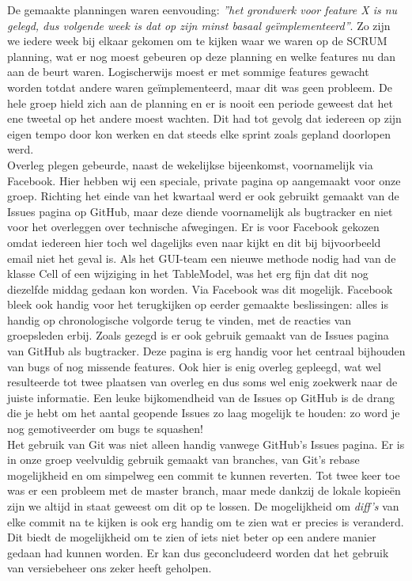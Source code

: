 \documentclass[a4paper,11pt,titlepage]{scrartcl}
\begin{document}
De gemaakte planningen waren eenvouding: \textit{''het grondwerk voor feature X is nu gelegd, dus volgende week is dat op zijn minst basaal ge\"{i}mplementeerd''}. Zo zijn we iedere week bij elkaar gekomen om te kijken waar we waren op de SCRUM planning, wat er nog moest gebeuren op deze planning en welke features nu dan aan de beurt waren. Logischerwijs moest er met sommige features gewacht worden totdat andere waren ge\"{i}mplementeerd, maar dit was geen probleem. De hele groep hield zich aan de planning en er is nooit een periode geweest dat het ene tweetal op het andere moest wachten. Dit had tot gevolg dat iedereen op zijn eigen tempo door kon werken en dat steeds elke sprint zoals gepland doorlopen werd.\\

\newpage Overleg plegen gebeurde, naast de wekelijkse bijeenkomst, voornamelijk via Facebook. Hier hebben wij een speciale, private pagina op aangemaakt voor onze groep. Richting het einde van het kwartaal werd er ook gebruikt gemaakt van de Issues pagina op GitHub, maar deze diende voornamelijk als bugtracker en niet voor het overleggen over technische afwegingen. Er is voor Facebook gekozen omdat iedereen hier toch wel dagelijks even naar kijkt en dit bij bijvoorbeeld email niet het geval is. Als het GUI-team een nieuwe methode nodig had van de klasse Cell of een wijziging in het TableModel, was het erg fijn dat dit nog diezelfde middag gedaan kon worden. Via Facebook was dit mogelijk. Facebook bleek ook handig voor het terugkijken op eerder gemaakte beslissingen: alles is handig op chronologische volgorde terug te vinden, met de reacties van groepsleden erbij. Zoals gezegd is er ook gebruik gemaakt van de Issues pagina van GitHub als bugtracker. Deze pagina is erg handig voor het centraal bijhouden van bugs of nog missende features. Ook hier is enig overleg gepleegd, wat wel resulteerde tot twee plaatsen van overleg en dus soms wel enig zoekwerk naar de juiste informatie. Een leuke bijkomendheid van de Issues op GitHub is de drang die je hebt om het aantal geopende Issues zo laag mogelijk te houden: zo word je nog gemotiveerder om bugs te squashen!\\

Het gebruik van Git was niet alleen handig vanwege GitHub’s Issues pagina. Er is in onze groep veelvuldig gebruik gemaakt van branches, van Git’s rebase mogelijkheid en om simpelweg een commit te kunnen reverten. Tot twee keer toe was er een probleem met de master branch, maar mede dankzij de lokale kopieën zijn we altijd in staat geweest om dit op te lossen. De mogelijkheid om \textit{diff’s} van elke commit na te kijken is ook erg handig om te zien wat er precies is veranderd. Dit biedt de mogelijkheid om te zien of iets niet beter op een andere manier gedaan had kunnen worden. Er kan dus geconcludeerd worden dat het gebruik van versiebeheer ons zeker heeft geholpen.\\
\end{document}
